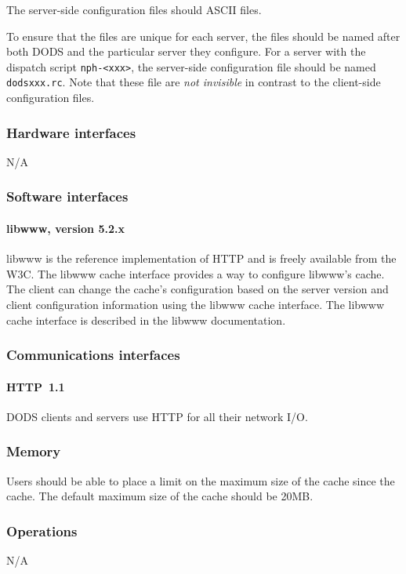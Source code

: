 \documentclass{article}
\begin{document}
The server-side configuration files should ASCII files.

To ensure that the files are unique for each server, the files should be
named after both DODS and the particular server they configure. For a server
with the dispatch script \texttt{nph-<xxx>}, the server-side configuration
file should be named \texttt{dodsxxx.rc}. Note that these file are \emph{not
  invisible} in contrast to the client-side configuration files.

\subsubsection{Hardware interfaces}
N/A

\subsubsection{Software interfaces}
\paragraph{libwww, version 5.2.x}
libwww is the reference implementation of HTTP and is freely available from
the \ac{W3C}. The libwww cache interface provides a way to configure libwww's
cache. The client can change the cache's configuration based on the server
version and client configuration information using the libwww cache
interface. The libwww cache interface is described in the libwww
documentation.

\subsubsection{Communications interfaces}
\paragraph{HTTP~1.1} DODS clients and servers use HTTP for all their network
I/O.

\subsubsection{Memory}
Users should be able to place a limit on the maximum size of the cache since
the cache. The default maximum size of the cache should be 20MB.

\subsubsection{Operations}
N/A
\end{document}
